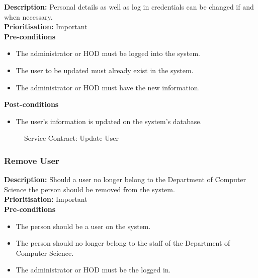 \documentclass[a4paper]{article}
\begin{document}
        \textbf{Description:} Personal details as well as log in credentials can be changed if and when necessary.\\
         \textbf{Prioritisation:} Important\\
         
        \textbf{Pre-conditions}
         \begin{itemize}
            \item The administrator or HOD must be logged into the system.
            \item The user to be updated must already exist in the system.
            \item The administrator or HOD must have the new information.
       \end{itemize}
        
        \textbf{Post-conditions}
        \begin{itemize}
            \item The user's information is updated on the system's database.
        \end{itemize}
        
            	\begin{figure}[H]
            		\centering
            		\caption{Service Contract: Update User}
            	\end{figure}
        \pagebreak
    \subsubsection{Remove User}
        
        \textbf{Description:} Should a user no longer belong to the Department of Computer Science the person should be removed from the system.\\
        \textbf{Prioritisation:} Important\\
        
        \textbf{Pre-conditions}
         \begin{itemize}
            \item The person should be a user on the system.
            \item The person should no longer belong to the staff of the Department of Computer Science.
            \item The administrator or HOD must be the logged in.
       \end{itemize}
        
\end{document}
